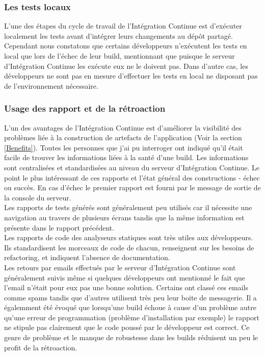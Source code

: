       \subsubsection{Les tests locaux}
      L'une des étapes du cycle de travail de l'Intégration Continue est d'exécuter localement les tests avant d'intégrer leurs changements au dépôt partagé. Cependant nous constatons que certains développeurs n'exécutent les tests en local que lors de l'échec de leur build, mentionnant que puisque le serveur d'Intégration Continue les exécute eux ne le doivent pas. Dans d'autre cas, les développeurs ne sont pas en mesure d'effectuer les tests en local ne disposant pas de l'environnement nécessaire.

      \subsubsection{Usage des rapport et de la rétroaction}
      L'un des avantages de l'Intégration Continue est d'améliorer la visibilité des problèmes liée à la construction de artefacts de l'application (Voir la section \ref{Benefits}). Toutes les personnes que j'ai pu interroger ont indiqué qu'il était facile de trouver les informations liées à la santé d'une build. Les informations sont centralisées et standardisées au niveau du serveur d'Intégration Continue. Le point le plus intéressant de ces rapports et l'état général des constructions - échec ou succès. En cas d'échec le premier rapport est fourni par le message de sortie de la console du serveur.\\

      Les rapports de tests générés sont généralement peu utilisés car il nécessite une navigation au travers de plusieurs écrans tandis que la même information est présente dans le rapport précédent.\\

      Les rapports de code des analyseurs statiques sont très utiles aux développeurs. Ils standardisent les morceaux de code de chacun, renseignent sur les besoins de refactoring, et indiquent l'absence de documentation.\\

      Les retours par emails effectués par le serveur d'Intégration Continue sont généralement suivis même si quelques développeurs ont mentionné le fait que l'email n'était pour eux pas une bonne solution. Certains ont classé ces emails comme spams tandis que d'autres utilisent très peu leur boite de messagerie. Il a égalemment été évoqué que lorsqu'une build échoue à cause d'un problème autre qu'une erreur de programmation (problème d'installation par exemple) le rapport ne stipule pas clairement que le code poussé par le développeur est correct. Ce genre de problème et le manque de robustesse dans les builds réduisent un peu le profit de la rétroaction.\\

